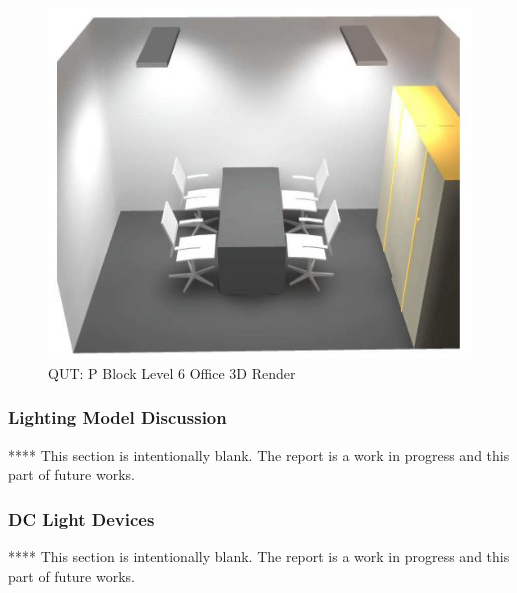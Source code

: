 \begin{figure}[H]
	\hfill\includegraphics[width = 150mm]{images/project-model/dialux-office-3D}\hspace*{\fill}
	\caption{QUT: P Block Level 6 Office 3D Render} 
	\label{fig:dialux-office-3D}
\end{figure}

\subsubsection{Lighting Model Discussion}

****
\newline
This section is intentionally blank. The report is a work in progress and this part of future works.  


\subsubsection{DC Light Devices}

****
\newline
This section is intentionally blank. The report is a work in progress and this part of future works.  

